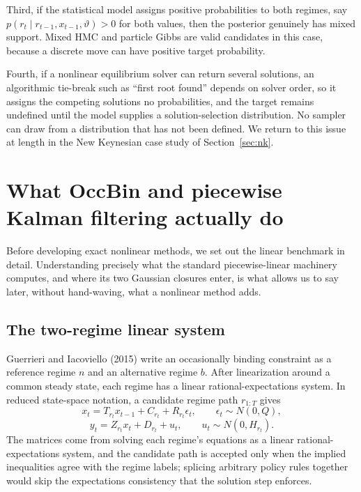 \documentclass[11pt]{article}
\begin{document}
Third, if the statistical model assigns positive probabilities to both
regimes, say \(p(r_t\mid r_{t-1},x_{t-1},\vartheta)>0\) for both
values, then the posterior genuinely has mixed support. Mixed HMC and
particle Gibbs are valid candidates in this case, because a discrete move can
have positive target probability.

Fourth, if a nonlinear equilibrium solver can return several solutions, an
algorithmic tie-break such as ``first root found'' depends on solver order,
so it assigns the competing solutions no probabilities, and the target
remains undefined until the model supplies a solution-selection
distribution. No sampler can draw from a distribution that has not been
defined. We return to this issue at length in the New Keynesian
case study of Section~\ref{sec:nk}.

\section{What OccBin and piecewise Kalman filtering actually do}\label{sec:linear}

Before developing exact nonlinear methods, we set out the linear benchmark in
detail. Understanding precisely what the standard piecewise-linear machinery
computes, and where its two Gaussian closures enter, is what allows us
to say later, without hand-waving, what a nonlinear method adds.

\subsection{The two-regime linear system}\label{sec:linear-tworegime}

Guerrieri and Iacoviello (2015) write an occasionally binding constraint as a
reference regime \(n\) and an alternative regime \(b\). After linearization
around a common steady state, each regime has a linear rational-expectations
system. In reduced state-space notation, a candidate regime path \(r_{1:T}\)
gives
\begin{equation}\label{eq:6}
 x_t=T_{r_t}x_{t-1}+C_{r_t}+R_{r_t}\epsilon_t,
 \qquad \epsilon_t\sim N(0,Q),
\end{equation}
\begin{equation}\label{eq:7}
 y_t=Z_{r_t}x_t+D_{r_t}+u_t,
 \qquad u_t\sim N(0,H_{r_t}).
\end{equation}
The matrices come from solving each regime's equations as a linear
rational-expectations system, and the
candidate path is accepted only when the implied inequalities agree with the
regime labels; splicing arbitrary policy rules together would skip the
expectations consistency that the solution step enforces.
\end{document}
